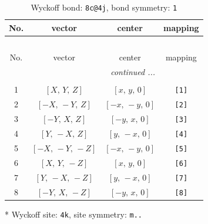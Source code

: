 \documentclass[fleqn,8pt]{jsarticle}
\begin{document}
\renewcommand{\arraystretch}{1.2}
\begin{longtable}{cccc}
\caption{Wyckoff bond: {\tt 8c@4j}, bond symmetry: {\tt 1}}
 \\
 \hline \hline
No. & vector & center & mapping \\ \hline \endfirsthead

\multicolumn{3}{l}{\tablename\ \thetable{}} \\
 \hline \hline
No. & vector & center & mapping \\ \hline \endhead

 \hline \hline
\multicolumn{3}{r}{\footnotesize\it continued ...} \\ \endfoot

 \hline \hline
\multicolumn{3}{r}{} \\ \endlastfoot

1 & $\left[ X,\, Y,\, Z \right]$ & $\left[ x,\, y,\, 0 \right]$ & {\tt [1]} \\ \hline
2 & $\left[ - X,\, - Y,\, Z \right]$ & $\left[ - x,\, - y,\, 0 \right]$ & {\tt [2]} \\ \hline
3 & $\left[ - Y,\, X,\, Z \right]$ & $\left[ - y,\, x,\, 0 \right]$ & {\tt [3]} \\ \hline
4 & $\left[ Y,\, - X,\, Z \right]$ & $\left[ y,\, - x,\, 0 \right]$ & {\tt [4]} \\ \hline
5 & $\left[ - X,\, - Y,\, - Z \right]$ & $\left[ - x,\, - y,\, 0 \right]$ & {\tt [5]} \\ \hline
6 & $\left[ X,\, Y,\, - Z \right]$ & $\left[ x,\, y,\, 0 \right]$ & {\tt [6]} \\ \hline
7 & $\left[ Y,\, - X,\, - Z \right]$ & $\left[ y,\, - x,\, 0 \right]$ & {\tt [7]} \\ \hline
8 & $\left[ - Y,\, X,\, - Z \right]$ & $\left[ - y,\, x,\, 0 \right]$ & {\tt [8]} \\
\end{longtable}
* Wyckoff site: {\tt 4k}, site symmetry: {\tt m..}
\renewcommand{\arraystretch}{1.2}
\end{document}

